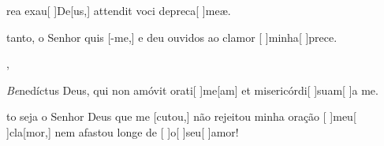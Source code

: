 {  {\item {}rea exau[ ]{De}[us,] attendit voci depreca[ ]{me}æ.}%
    {\item {}tanto, o Senhor quis [-me,] e deu ouvidos ao clamor [ ]{mi}{nha}[ ]{pre}ce.},
  {\item {}\textit{Be}{ne}díctus Deus, qui non amóvit orati[ ]{me}[\-am] et misericórdi[ ]{su}{am}[ ]{a} me.}%
    {\item {}to seja o Senhor Deus que me [cutou,] não rejeitou minha oração [ ]{meu}[ ]{cla}[mor,] nem afastou longe de [ ]{o}[ ]{seu}[ ]{a}mor!}
}
